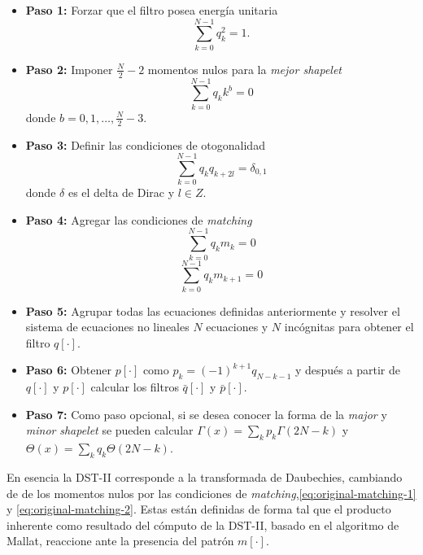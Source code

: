 \begin{itemize}
	\item \textbf{Paso 1:} Forzar que el filtro posea energía unitaria
		\begin{equation}\label{eq:unitary-energy}
			\sum_{k=0}^{N-1}q_k^2 = 1.
		\end{equation}
	\item \textbf{Paso 2:} Imponer $\frac{N}{2} -2 $ momentos nulos para la \textit{mejor shapelet}
		\begin{equation}\label{eq:vanishing-moments}
			\sum_{k=0}^{N-1}q_{k}k^b = 0
		\end{equation}
		donde $b=0,1,\dotsc,\frac{N}{2}-3$.
	\item \textbf{Paso 3:} Definir las condiciones de otogonalidad
		\begin{equation}\label{eq:orthogonality}
			\sum_{k=0}^{N-1} q_{k}q_{k+2l} = \delta_{0,1}
		\end{equation}
		donde $\delta$ es el delta de Dirac y $l\in Z$.
	\item \textbf{Paso 4:} Agregar las condiciones de \textit{matching}
		\begin{equation}\label{eq:original-matching-1}
			\sum_{k=0}^{N-1} q_{k}m_{k} = 0
		\end{equation}
		\begin{equation}\label{eq:original-matching-2}
			\sum_{k=0}^{N-1} q_{k}m_{k+1} = 0
		\end{equation}
	\item \textbf{Paso 5:} Agrupar todas las ecuaciones definidas anteriormente y resolver el sistema de ecuaciones
		no lineales $N$ ecuaciones y $N$ incógnitas para obtener el filtro $q[\cdot]$.
	\item \textbf{Paso 6:} Obtener $p[\cdot]$ como $p_k=(-1)^{k+1}q_{N-k-1}$ y 
		después a partir de $q[\cdot]$ y $p[\cdot]$ calcular los filtros $\bar q[\cdot]$ y $\bar p[\cdot]$.
	\item \textbf{Paso 7:} Como paso opcional, si se desea conocer la forma de la \textit{major} y \textit{minor}
		\textit{shapelet} se pueden calcular $\Gamma(x)=\sum_k p_k \Gamma(2N-k)$ y $\Theta(x)=\sum_k q_k \Theta(2N-k)$.
\end{itemize}

En esencia la DST-II corresponde a la transformada de Daubechies, cambiando de de los momentos nulos por las
condiciones de \textit{matching},\ref{eq:original-matching-1} y \ref{eq:original-matching-2}. Estas están definidas de forma tal que el
producto inherente como resultado del cómputo de la DST-II, basado en el algoritmo de Mallat, reaccione ante 
la presencia del patrón $m[\cdot]$.

